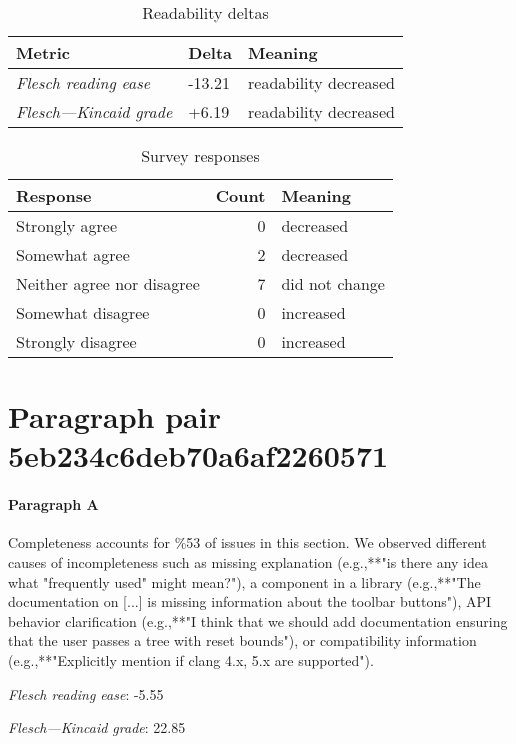 \bigskip\begin{table}[!h]
\centering
\begin{tabular}{lll}
\toprule
               \textbf{Metric} & \textbf{Delta} &       \textbf{Meaning} \\
\midrule
    \emph{Flesch reading ease} &         -13.21 &  readability decreased \\
 \emph{Flesch---Kincaid grade} &          +6.19 &  readability decreased \\
\bottomrule
\end{tabular}
\caption*{Readability deltas}\end{table}

\begin{table}[!h]
\centering
\begin{tabular}{lrl}
\toprule
          \textbf{Response} &  \textbf{Count} & \textbf{Meaning} \\
\midrule
             Strongly agree &               0 &        decreased \\
             Somewhat agree &               2 &        decreased \\
 Neither agree nor disagree &               7 &   did not change \\
          Somewhat disagree &               0 &        increased \\
          Strongly disagree &               0 &        increased \\
\bottomrule
\end{tabular}
\caption*{Survey responses}\end{table}


\newpage
\section{Paragraph pair 5eb234c6deb70a6af2260571}
\paragraph{Paragraph A}
Completeness accounts for \%53 of issues in this section. We observed different causes of incompleteness such as missing explanation (e.g.,**"is there any idea what "frequently used" might mean?"), a component in a library (e.g.,**"The documentation on [...] is missing information about the toolbar buttons"), API behavior clarification (e.g.,**"I think that we should add documentation ensuring that the user passes a tree with reset bounds"), or compatibility information (e.g.,**"Explicitly mention if clang 4.x, 5.x are supported").\par\medskip
\emph{Flesch reading ease}: -5.55\par
\emph{Flesch---Kincaid grade}: 22.85

